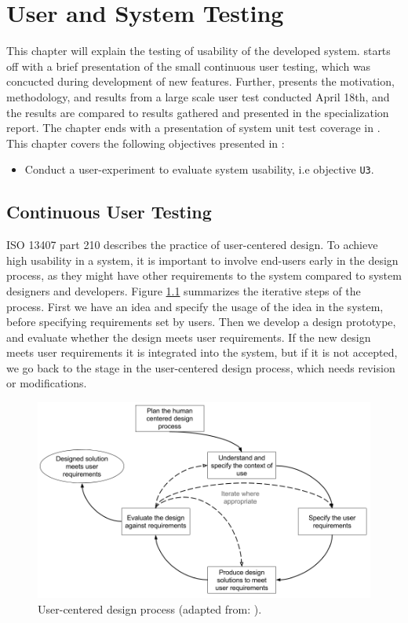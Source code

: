 \chapter{User and System Testing}
\label{ch:testing}
This chapter will explain the testing of usability of the developed system.  starts off with a brief presentation of the small continuous user testing, which was concucted during development of new features. Further,  presents the motivation, methodology, and results from a large scale user test conducted April 18th, and the results are compared to results gathered and presented in the specialization report. The chapter ends with a presentation of system unit test coverage in . This chapter covers the following objectives presented in :
\begin{itemize}
  \item Conduct a user-experiment to evaluate system usability, i.e objective \texttt{U3}.
\end{itemize}

\section{Continuous User Testing}
\label{sec:cont-user-testing}
ISO 13407 part 210 \cite{iso1999HCD} describes the practice of user-centered design. To achieve high usability in a system, it is important to involve end-users early in the design process, as they might have other requirements to the system compared to system designers and developers. Figure \ref{fig:user-centered-design} summarizes the iterative steps of the process. First we have an idea and specify the usage of the idea in the system, before specifying requirements set by users. Then we develop a design prototype, and evaluate whether the design meets user requirements. If the new design meets user requirements it is integrated into the system, but if it is not accepted, we go back to the stage in the user-centered design process, which needs revision or modifications. \\

\begin{figure}
  \centering
  \includegraphics[width=1.0\textwidth]{figs/iterative-design-process.png}
  \caption[User-centered design process]{User-centered design process (adapted from: \cite{iso1999HCD}).}
  \label{fig:user-centered-design}
\end{figure}

